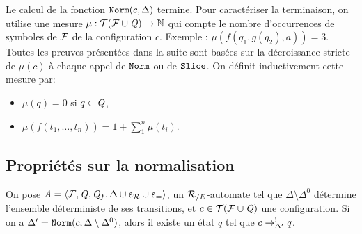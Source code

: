 \begin{remark}
  Le calcul de la fonction $\mathtt{Norm}(c, \Delta)$ termine. Pour caractériser la terminaison, on utilise
  une mesure $\mu : \mathcal{ T(F \cup \mathit Q)} \rightarrow \mathbb N$  qui compte le nombre d'occurrences de symboles de $\mathcal{F}$ de la configuration $c$.
  Exemple : $\mu(f(q_1, g(q_2), a)) = 3$. Toutes les preuves présentées dans la suite sont basées sur la décroissance
  stricte de $\mu(c)$ à chaque appel de $\mathtt{Norm}$ ou de $\mathtt{Slice}$.
  On définit inductivement cette mesure par:
  \begin{itemize}
  \item 
    $\mu(q) = 0$ si $q \in \mathit Q$,
  \item 
    $\mu(f(t_1,\dots, t_n)) = 1 + \sum_1^n \mu(t_i)$.
  \end{itemize}
\end{remark}


\subsection*{Propriétés sur la normalisation}

\begin{property}%
  \label{prop:norm_determinism}
  On pose  $\mathit A = \langle \mathcal{F}, \mathit Q, \mathit Q_f, \Delta \cup \upvarepsilon_{\mathcal R} \cup \upvarepsilon_{=}\rangle$, un ${\mathcal R_{/E}}$-automate tel que 
  $\Delta \setminus \Delta^0$ détermine l'ensemble déterministe de ses transitions, et $c \in \mathcal{ T(F \cup \mathit Q)}$ une configuration. 
  Si on a $\Delta' = \mathtt{Norm}(c, \Delta \setminus \Delta^0)$,  alors il existe un état $q$ tel que  $c \rightarrow^!_{\Delta'} q$.
\end{property}

